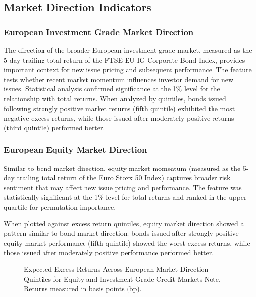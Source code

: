 \subsection{Market Direction Indicators}

\subsubsection{European Investment Grade Market Direction}
The direction of the broader European investment grade market, measured as the 5-day trailing total return of the FTSE EU IG Corporate Bond Index, provides important context for new issue pricing and subsequent performance. The feature tests whether recent market momentum influences investor demand for new issues. Statistical analysis confirmed significance at the 1\% level for the relationship with total returns. When analyzed by quintiles, bonds issued following strongly positive market returns (fifth quintile) exhibited the most negative excess returns, while those issued after moderately positive returns (third quintile) performed better.

\subsubsection{European Equity Market Direction}
Similar to bond market direction, equity market momentum (measured as the 5-day trailing total return of the Euro Stoxx 50 Index) captures broader risk sentiment that may affect new issue pricing and performance. The feature was statistically significant at the 1\% level for total returns and ranked in the upper quartile for permutation importance.

When plotted against excess return quintiles, equity market direction showed a pattern similar to bond market direction: bonds issued after strongly positive equity market performance (fifth quintile) showed the worst excess returns, while those issued after moderately positive performance performed better.

\begin{figure}[h]
    \begin{center}
        
    \end{center}
    \caption{Expected Excess Returns Across European Market Direction Quintiles for Equity and Investment-Grade Credit Markets Note. Returns measured in basis points (bp).}
    \label{fig:eu_direction}
\end{figure}

